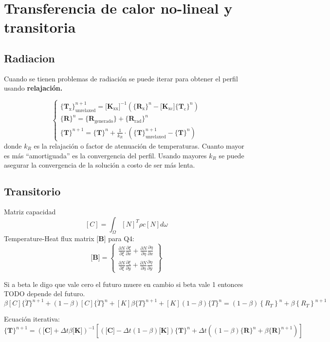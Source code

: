 \documentclass[11pt, a4paper,titlepage]{article}
\newcommand{\Mme}[1]{\boldsymbol{[}\mathbf{#1} \boldsymbol{]}}
\newcommand{\Cme}[1]{\boldsymbol{\{ }\mathbf{#1} \boldsymbol{\}} }
\newcommand{\MB}{\Mme{B}}
\newcommand{\MK}{\Mme{K}}
\newcommand{\MC}{\Mme{C}}
\newcommand{\CTx}{\Cme{T_{\mathrm{x}}}}
\newcommand{\CTc}{\Cme{T_{\mathrm{c}}}}
\newcommand{\CRx}{\Cme{R_{\mathrm{x}}}}
\newcommand{\CR}{\Cme{R}}
\newcommand{\MKxx}{\Mme{K_{\mathrm{xx}}}}
\newcommand{\MKxc}{\Mme{K_{\mathrm{xc}}}}
\begin{document}
\section{Transferencia de calor no-lineal y transitoria}

\subsection*{Radiacion}
Cuando se tienen problemas de radiación se puede iterar para obtener el perfil usando \textbf{relajación.}


\begin{equation}
\begin{cases}
\CTx^{n+1}_{\mathrm{unrelaxed}} =  \MKxx^{-1}  \left(\CRx^{n} - \MKxc \CTc^{n}\right)\\
\CR^{n} = \Cme{R_{\mathrm{generado}}}+ \Cme{R_{\mathrm{rad}}}^{n} \\
\Cme{T}^{n+1} = \Cme{T}^n + \frac{1}{k_R} \cdot \left( \Cme{T}^{n+1}_{\mathrm{unrelaxed}} - \Cme{T}^{n} \right)
\end{cases}
\end{equation}
donde $k_R$ es la relajación o factor de atenuación de temperaturas. Cuanto mayor es más ``amortiguada'' es la convergencia del perfil. Usando mayores $k_R$ se puede asegurar la convergencia de la solución a costo de ser más lenta.


\subsection*{Transitorio}
Matriz capacidad
\[
[C]=\int_{\Omega}[N]^{T} \rho c[N] d \omega
\]
Temperature-Heat flux matrix $\MB$ para Q4:
\[
\MB =
\begin{Bmatrix}
\frac{\partial N}{\partial \xi} \frac{\partial \xi}{\partial x} + \frac{\partial N}{\partial \eta} \frac{\partial \eta}{\partial x} \\
\frac{\partial N}{\partial \xi} \frac{\partial \xi}{\partial y} + \frac{\partial N}{\partial \eta} \frac{\partial \eta}{\partial y} 
\end{Bmatrix}
\]

Si a beta le digo que vale cero el futuro muere en cambio si beta vale 1 entonces TODO depende del futuro.
\[
\beta[C]\{\dot{T}\}^{n+1}+(1-\beta)[C]\{\dot{T}\}^{n}+[K] \beta\{T\}^{n+1}+[K](1-\beta)\{T\}^{n}=(1-\beta)\left\{R_{T}\right\}^{n}+\beta\left\{R_{T}\right\}^{n+1}
\]

Ecuación iterativa:
\begin{equation}
\Cme{T}^{n+1} = \left( \MC +\Delta t \beta \MK \right)^{-1} \left[ \left(\MC -\Delta t(1-\beta) \MK\right) \Cme{T}^n +\Delta t \left( (1-\beta) \Cme{R}^n + \beta \Cme{R}^{n+1}  \right)\right]
\end{equation}
\end{document}
